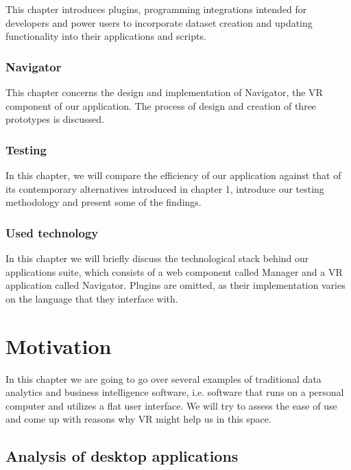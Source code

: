 \documentclass[thesis=M,english,hidelinks]{FITthesisXE}[2012/06/26]
\begin{document}
\begin{introduction}
This chapter introduces plugins, programming integrations intended for developers and power users to incorporate dataset creation and updating functionality into their applications and scripts.

\subsection{Navigator}

This chapter concerns the design and implementation of Navigator, the VR component of our application. The process of design and creation of three prototypes is discussed.

\subsection{Testing}

In this chapter, we will compare the efficiency of our application against that of its contemporary alternatives introduced in chapter 1, introduce our testing methodology and present some of the findings.

\subsection{Used technology}

In this chapter we will briefly discuss the technological stack behind our applications suite, which consists of a web component called Manager and a VR application called Navigator. Plugins are omitted, as their implementation varies on the language that they interface with.

\end{introduction}

\chapter{Motivation}

In this chapter we are going to go over several examples of traditional data analytics and business intelligence software, i.e. software that runs on a personal computer and utilizes a flat user interface. We will try to assess the ease of use and come up with reasons why VR might help us in this space.

\section{Analysis of desktop applications}
\end{document}
